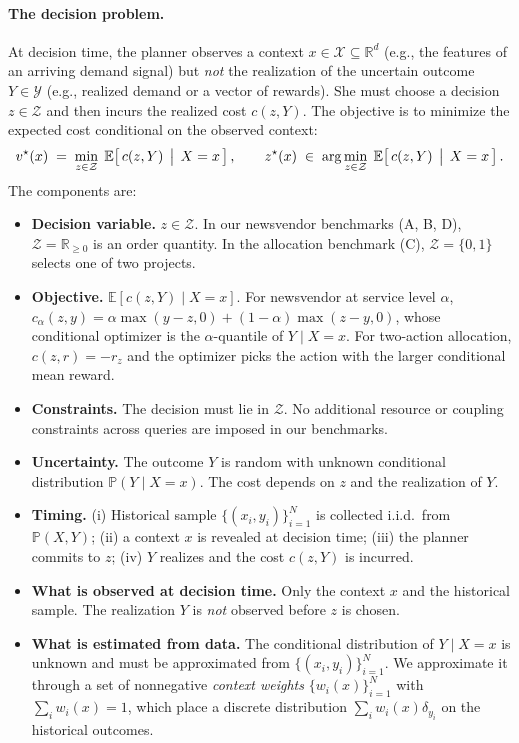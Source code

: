 \documentclass[11pt]{article}
\begin{document}
\paragraph{The decision problem.}
At decision time, the planner observes a context $x \in \mathcal X \subseteq \mathbb R^d$ (e.g., the features of an arriving demand signal) but \emph{not} the realization of the uncertain outcome $Y \in \mathcal Y$ (e.g., realized demand or a vector of rewards). She must choose a decision $z \in \mathcal Z$ and then incurs the realized cost $c(z,Y)$. The objective is to minimize the expected cost conditional on the observed context:
\begin{equation}\label{eq:contextual-so}
v^\star(x) \;=\; \min_{z \in \mathcal Z}\; \mathbb E\!\left[\,c(z,Y)\,\bigm|\, X=x\,\right],
\qquad
z^\star(x) \;\in\; \arg\min_{z \in \mathcal Z}\; \mathbb E\!\left[\,c(z,Y)\,\bigm|\, X=x\,\right].
\end{equation}
The components are:
\begin{itemize}
    \item \textbf{Decision variable.} $z \in \mathcal Z$. In our newsvendor benchmarks (A, B, D), $\mathcal Z = \mathbb R_{\ge 0}$ is an order quantity. In the allocation benchmark (C), $\mathcal Z = \{0,1\}$ selects one of two projects.
    \item \textbf{Objective.} $\mathbb E[c(z,Y)\mid X=x]$. For newsvendor at service level $\alpha$, $c_\alpha(z,y)=\alpha\max(y-z,0)+(1-\alpha)\max(z-y,0)$, whose conditional optimizer is the $\alpha$-quantile of $Y\mid X{=}x$. For two-action allocation, $c(z,r)=-r_z$ and the optimizer picks the action with the larger conditional mean reward.
    \item \textbf{Constraints.} The decision must lie in $\mathcal Z$. No additional resource or coupling constraints across queries are imposed in our benchmarks.
    \item \textbf{Uncertainty.} The outcome $Y$ is random with unknown conditional distribution $\mathbb P(Y\mid X{=}x)$. The cost depends on $z$ and the realization of $Y$.
    \item \textbf{Timing.} (i) Historical sample $\{(x_i,y_i)\}_{i=1}^N$ is collected i.i.d.\ from $\mathbb P(X,Y)$; (ii) a context $x$ is revealed at decision time; (iii) the planner commits to $z$; (iv) $Y$ realizes and the cost $c(z,Y)$ is incurred.
    \item \textbf{What is observed at decision time.} Only the context $x$ and the historical sample. The realization $Y$ is \emph{not} observed before $z$ is chosen.
    \item \textbf{What is estimated from data.} The conditional distribution of $Y\mid X{=}x$ is unknown and must be approximated from $\{(x_i,y_i)\}_{i=1}^N$. We approximate it through a set of nonnegative \emph{context weights} $\{w_i(x)\}_{i=1}^N$ with $\sum_i w_i(x)=1$, which place a discrete distribution $\sum_i w_i(x)\delta_{y_i}$ on the historical outcomes.
\end{itemize}
\end{document}
